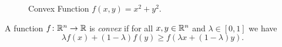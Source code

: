 \documentclass[../open-optimization/open-optimization.tex]{subfiles}
\begin{document}
\begin{figure}[H]
\begin{center}
\end{center}
    \caption{Convex Function $f(x,y) = x^2 + y^2$.}
\end{figure} 





\begin{definition}
A function $f \colon {\mathbb{R}}^n \to {\mathbb{R}}$ is \emph{convex} if for all $x,y \in {\mathbb{R}}^n$ and $\lambda \in [0,1]$ we have 
\begin{equation}
\lambda f(x) + (1-\lambda)f(y) \geq f(\lambda x + (1-\lambda) y).
\end{equation}
\end{definition}
\end{document}
